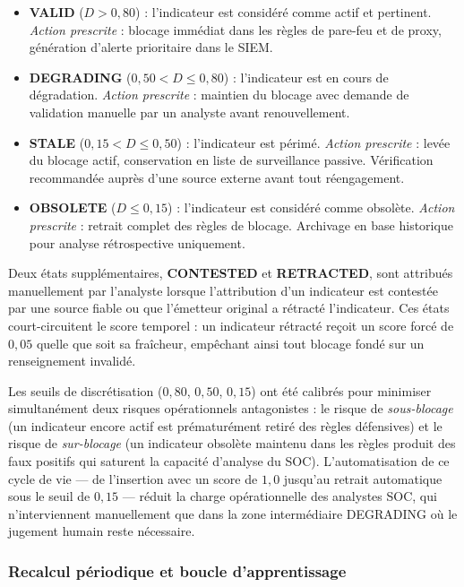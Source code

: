 \begin{itemize}
    \item \textbf{VALID} ($D > 0{,}80$) : l'indicateur est considéré comme actif et pertinent. \textit{Action prescrite} : blocage immédiat dans les règles de pare-feu et de proxy, génération d'alerte prioritaire dans le SIEM.
    \item \textbf{DEGRADING} ($0{,}50 < D \leq 0{,}80$) : l'indicateur est en cours de dégradation. \textit{Action prescrite} : maintien du blocage avec demande de validation manuelle par un analyste avant renouvellement.
    \item \textbf{STALE} ($0{,}15 < D \leq 0{,}50$) : l'indicateur est périmé. \textit{Action prescrite} : levée du blocage actif, conservation en liste de surveillance passive. Vérification recommandée auprès d'une source externe avant tout réengagement.
    \item \textbf{OBSOLETE} ($D \leq 0{,}15$) : l'indicateur est considéré comme obsolète. \textit{Action prescrite} : retrait complet des règles de blocage. Archivage en base historique pour analyse rétrospective uniquement.
\end{itemize}

Deux états supplémentaires, \textbf{CONTESTED} et \textbf{RETRACTED}, sont attribués manuellement par l'analyste lorsque l'attribution d'un indicateur est contestée par une source fiable ou que l'émetteur original a rétracté l'indicateur. Ces états court-circuitent le score temporel : un indicateur rétracté reçoit un score forcé de $0{,}05$ quelle que soit sa fraîcheur, empêchant ainsi tout blocage fondé sur un renseignement invalidé.

Les seuils de discrétisation ($0{,}80$, $0{,}50$, $0{,}15$) ont été calibrés pour minimiser simultanément deux risques opérationnels antagonistes : le risque de \textit{sous-blocage} (un indicateur encore actif est prématurément retiré des règles défensives) et le risque de \textit{sur-blocage} (un indicateur obsolète maintenu dans les règles produit des faux positifs qui saturent la capacité d'analyse du SOC). L'automatisation de ce cycle de vie --- de l'insertion avec un score de $1{,}0$ jusqu'au retrait automatique sous le seuil de $0{,}15$ --- réduit la charge opérationnelle des analystes SOC, qui n'interviennent manuellement que dans la zone intermédiaire DEGRADING où le jugement humain reste nécessaire.

\subsubsection{Recalcul périodique et boucle d'apprentissage}

